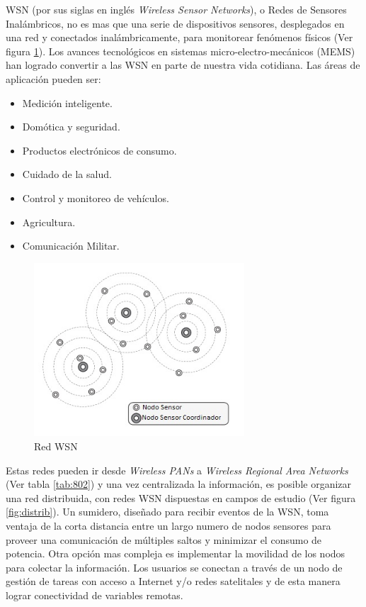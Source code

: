WSN (por sus siglas en inglés \textit{Wireless Sensor Networks}), o Redes de Sensores Inalámbricos, no es mas que una serie de dispositivos sensores, desplegados en una red y conectados inalámbricamente, para monitorear fenómenos físicos (Ver figura \ref{fig:wsn}). Los avances tecnológicos en sistemas micro-electro-mecánicos (MEMS) han logrado convertir a las WSN en parte de nuestra vida cotidiana. Las áreas de aplicación pueden ser:
		\begin{itemize}
			\item Medición inteligente.
			\item Domótica y seguridad.
			\item Productos electrónicos de consumo.
			\item Cuidado de la salud.
			\item Control y monitoreo de vehículos.
			\item Agricultura.
			\item Comunicación Militar.
		\end{itemize}
		
\begin{figure}[h!]
	\centering
    \includegraphics[width=0.7\textwidth]{./Figures/WSN.jpg}
    	\caption{Red WSN}
	\label{fig:wsn}
\end{figure}
		
Estas redes pueden ir desde \textit{Wireless PANs} a \textit{Wireless Regional Area Networks} (Ver tabla \ref{tab:802}) y una vez centralizada la información, es posible organizar una red distribuida, con redes WSN dispuestas en campos de estudio (Ver figura \ref{fig:distrib}). Un sumidero, diseñado para recibir eventos de la WSN, toma ventaja de la corta distancia entre un largo numero de nodos sensores para proveer una comunicación de múltiples saltos y minimizar el consumo de potencia. Otra opción mas compleja es implementar la movilidad de los nodos para colectar la información. Los usuarios se conectan a través de un nodo de gestión de tareas con acceso a Internet y/o redes satelitales y de esta manera lograr conectividad de variables remotas.

